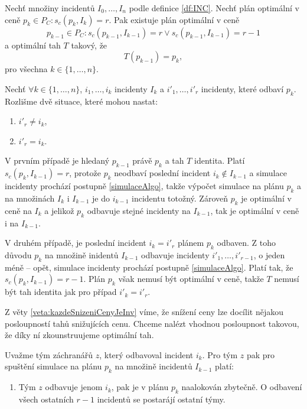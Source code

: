 \begin{veta}\label{veta:optimalniTahy}
  Nechť množiny incidentů $I_0, \dots, I_n$ podle definice \ref{df:INC}.
  Nechť plán optimální v ceně $p_k \in P_C \colon s_c(p_k, I_k) = r$.
  Pak existuje plán optimální v ceně
  \begin{equation*}
    p_{k-1} \in P_C \colon s_c(p_{k-1}, I_{k-1}) = r \lor s_c(p_{k-1}, I_{k-1}) = r - 1
  \end{equation*}
  a optimální tah $T$ takový, že
  \begin{equation*}
    T(p_{k-1}) = p_k,
  \end{equation*}
  pro všechna $k \in \{ 1, \dots, n\}$.
\end{veta}
\begin{dukaz}
  Nechť $\forall k \in \{ 1, \dots, n\}$, $i_1, \dots, i_k$ incidenty $I_k$ a $i'_1, \dots, i'_r$ incidenty, které odbaví $p_k$.
  Rozlišme dvě situace, které mohou nastat:
  \begin{enumerate}
    \item
      $i'_r \neq i_k$,

    \item
      $i'_r = i_k$.
  \end{enumerate}
  V prvním případě je hledaný $p_{k-1}$ právě $p_k$ a tah $T$ identita.
  Platí $s_c(p_k, I_{k-1}) = r$, protože $p_k$ neodbaví poslední incident $i_k \not \in I_{k-1}$ a simulace incidenty prochází postupně \ref{simulaceAlgo},
  takže výpočet simulace na plánu $p_{k}$ a na množinách $I_k$ i $I_{k-1}$ je do $i_{k-1}$ incidentu totožný.
  Zároveň $p_k$ je optimální v ceně na $I_k$ a jelikož $p_k$ odbavuje stejné incidenty na $I_{k-1}$, tak je optimální v ceně i na $I_{k-1}$.

  V druhém případě, je poslední incident $i_k = i'_r$ plánem $p_k$ odbaven.
  Z toho důvodu $p_k$ na množině inidentů $I_{k-1}$ odbavuje incidenty $i'_1, \dots, i'_{r-1}$, o jeden méně -- opět, simulace incidenty prochází postupně \ref{simulaceAlgo}.
  Platí tak, že $s_c(p_k, I_{k-1}) = r - 1$. Plán $p_k$ však nemusí být optimální v ceně, takže $T$ nemusí být tah identita jak pro případ $i'_k = i'_r$. 

  Z věty \ref{veta:kazdeSnizeniCenyJeInv} víme, že snížení ceny lze docílit nějakou posloupností tahů snižujících cenu.
  Chceme nalézt vhodnou posloupnost takovou, že díky ní zkounstruujeme optimální tah.

  Uvažme tým záchranářů $z$, který odbavoval incident $i_k$.
  Pro tým $z$ pak pro spuštění simulace na plánu $p_k$ na množině incidentů $I_{k-1}$ platí:
  \begin{enumerate}
    \item
      Tým $z$ odbavuje jenom $i_k$, pak je v plánu $p_k$ naalokován zbytečně. O odbavení všech ostatních $r-1$ incidentů se postarájí ostatní týmy.


\end{enumerate}
\end{dukaz}
